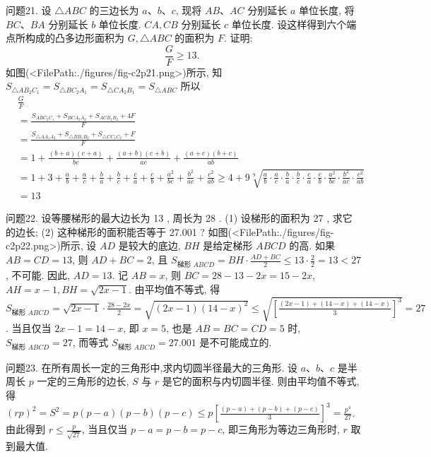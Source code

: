 问题21. 设 $\triangle A B C$ 的三边长为 $a 、 b 、 c$, 现将 $A B 、 A C$ 分别延长 $a$ 单位长度, 将 $B C 、 B A$ 分别延长 $b$ 单位长度.
$C A, C B$ 分别延长 $c$ 单位长度.
设这样得到六个端点所构成的凸多边形面积为 $G, \triangle A B C$ 的面积为 $F$. 证明:
$$
\frac{G}{F} \geqslant 13 \text {. }
$$
如图(<FilePath:./figures/fig-c2p21.png>)所示, 知 $S_{\triangle A B_2 C_1}=S_{\triangle B C_2 A_1}=S_{\triangle C A_2 B_1}=S_{\triangle A B C}$
所以 $$
\begin{aligned}
& \frac{G}{F} \\
& = \frac{S_{A B C_2 C_1}+S_{B C A_2 A_2}+S_{A C B_1 B_2}+4 F}{F} \\
& =\frac{S_{\triangle A A_1 A_2}+S_{\triangle B B_1 B_2}+S_{\triangle C C_1 C_2}+F}{F} \\
& =1+ \frac{(b+a)(c+a)}{b c}+\frac{(a+b)(c+b)}{a c}+\frac{(a+c)(b+c)}{a b}\\
& =1+3+\frac{a}{b}+\frac{a}{c}+\frac{b}{a}+\frac{b}{c}+\frac{c}{a}+\frac{c}{b}+\frac{a^2}{b c}+\frac{b^2}{a c}+\frac{c^2}{a b} \geqslant 4+9 \sqrt[9]{\frac{a}{b} \cdot \frac{a}{c} \cdot \frac{b}{a} \cdot \frac{b}{c} \cdot \frac{c}{a} \cdot \frac{c}{b} \cdot \frac{a^2}{b c} \cdot \frac{b^2}{a c} \cdot \frac{c^2}{a b}} \\
& =13
\end{aligned}
$$



问题22. 设等腰梯形的最大边长为 13 , 周长为 28 .
(1) 设梯形的面积为 27 , 求它的边长;
(2) 这种梯形的面积能否等于 27.001 ?
如图(<FilePath:./figures/fig-c2p22.png>)所示, 设 $A D$ 是较大的底边, $B H$ 是给定梯形 $A B C D$ 的高.
如果
$A B=C D=13$, 则 $A D+B C=2$, 且 $S_{\text {梯形 } A B C D}=B H \cdot \frac{A D+B C}{2} \leqslant 13 \cdot \frac{2}{2}= 13<27$, 不可能.
因此, $A D=13$. 记 $A B=x$, 则 $B C=28-13-2 x=15-2 x$, $A H=x-1, B H=\sqrt{2 x-1}$. 由平均值不等式, 得 $S_{\text {梯形 } A B C D}=\sqrt{2 x-1} \cdot \frac{28-2 x}{2} =\sqrt{(2 x-1)(14-x)^2} \leqslant \sqrt{\left[\frac{(2 x-1)+(14-x)+(14-x)}{3}\right]^3}=27$. 当且仅当 $2 x-1=14-x$, 即 $x=5$, 也是 $A B=B C=C D=5$ 时, $S_{\text {梯形 } A B C D}=27$, 而等式 $S_{\text {梯形 } A B C D}=27.001$ 是不可能成立的.



问题23. 在所有周长一定的三角形中,求内切圆半径最大的三角形.
设 $a 、 b 、 c$ 是半周长 $p$ 一定的三角形的边长, $S$ 与 $r$ 是它的面积与内切圆半径.
则由平均值不等式, 得 $(r p)^2=S^2=p(p-a)(p-b)(p-c) \leqslant p\left[\frac{(p-a)+(p-b)+(p-c)}{3}\right]^3=\frac{p^4}{27}$. 由此得到 $r \leqslant \frac{p}{\sqrt{27}}$, 当且仅当 $p- a=p-b=p-c$, 即三角形为等边三角形时, $r$ 取到最大值.



